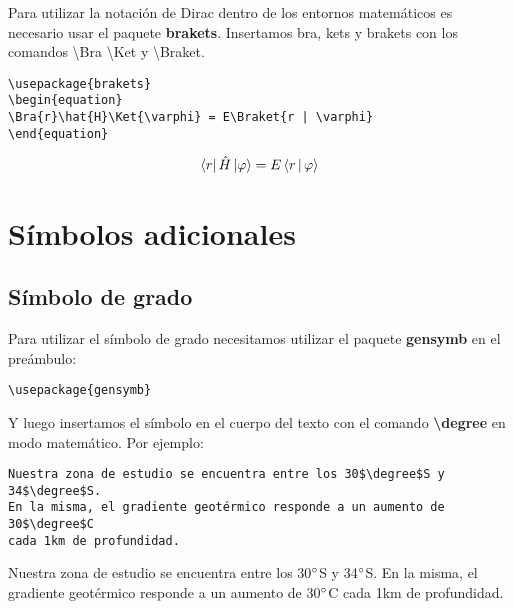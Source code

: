 \documentclass[a4paper,11pt]{article}
\begin{document}
Para utilizar la notación de Dirac dentro de los entornos matemáticos es necesario usar el paquete \textbf{brakets}. Insertamos bra, kets y brakets con los comandos \textbackslash Bra \textbackslash Ket y \textbackslash Braket.

\begin{verbatim}
\usepackage{brakets}
\begin{equation}
\Bra{r}\hat{H}\Ket{\varphi} = E\Braket{r | \varphi}
\end{equation}
\end{verbatim}

\begin{equation}
\Bra{r}\hat{H}\Ket{\varphi} =  E\Braket{r | \varphi}
\end{equation}

\section{Símbolos adicionales}

\subsection{Símbolo de grado}

Para utilizar el símbolo de grado necesitamos utilizar el paquete \textbf{gensymb} en el preámbulo:


\begin{verbatim}
\usepackage{gensymb}
\end{verbatim}

Y luego insertamos el símbolo en el cuerpo del texto con el comando \textbf{\textbackslash degree} en modo matemático. Por ejemplo:

\begin{verbatim}
Nuestra zona de estudio se encuentra entre los 30$\degree$S y 34$\degree$S.
En la misma, el gradiente geotérmico responde a un aumento de 30$\degree$C
cada 1km de profundidad.
\end{verbatim}

Nuestra zona de estudio se encuentra entre los 30$\degree$S y 34$\degree$S. En la misma, el gradiente geotérmico responde a un aumento de 30$\degree$C cada 1km de profundidad.
\end{document}

